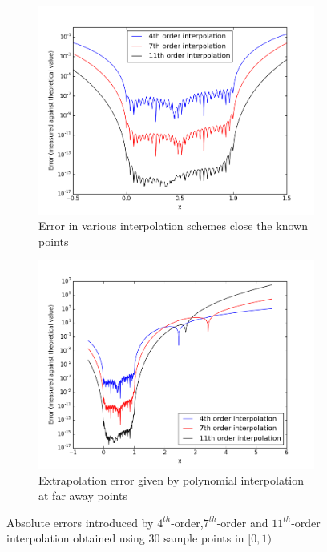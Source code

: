 \documentclass[11pt]{article}
\begin{document}
\begin{figure}
        \centering
        \begin{subfigure}{.5\textwidth}
  \centering
        \includegraphics[width=\linewidth]{q3/error_comp.png}
                \caption{Error in various interpolation schemes close the known points}
                \label{fig:q3_close}
                \end{subfigure}%
\begin{subfigure}{.5\textwidth}
  \centering
        \includegraphics[width=\linewidth]{q3/error_far.png}
                \caption{Extrapolation error given by polynomial interpolation at far away points}
                \label{fig:q3_far}
	\end{subfigure}
            
\caption{Absolute errors introduced by $4^{th}$-order,$7^{th}$-order and $11^{th}$-order interpolation obtained using 30 sample points in $[0,1)$}
\label{fig:q3}            
\end{figure}
\end{document}
